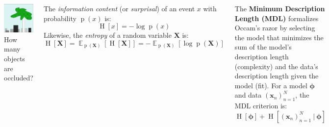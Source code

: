\documentclass[25pt,a0paper,landscape]{tikzposter}
\DeclareMathOperator{\opExpectation}{\mathbb{E}}
\newcommand{\E}[2]{\opExpectation_{#1} \left [ #2 \right ]}
\newcommand{\MidSymbol}[1][]{\:#1\:}
\newcommand{\given}{\MidSymbol[\vert]}
\DeclareMathOperator{\opInformationContent}{H}
\newcommand{\ICof}[1]{\opInformationContent[#1]}
\DeclareMathOperator{\opEntropy}{H}
\newcommand{\Hof}[1]{\opEntropy[#1]}
\DeclareMathOperator{\opp}{p}
\newcommand{\pof}[1]{\opp(#1)}
\newcommand{\h}{\boldsymbol{\phi}}
\newcommand{\xNset}{(\x_n)_{n=1}^N}
\newcommand{\x}{\boldsymbol{x}}
\newcommand{\X}{\boldsymbol{X}}
\begin{document}
\begin{columns}
{{\begin{backgroundbox}[title={Examples {\small (left: Reddit, right: \citet{mackay2003information})}}]
\begin{multicols}{2}
        \includegraphics[width=\linewidth]{mackay_343_example.png}
        {\small How many objects are occluded?}
      \end{multicols}
    \end{backgroundbox}
    \begin{backgroundbox}[title=Shannon's Information Content]
      The \emph{information content} (or \emph{surprisal}) of an event $x$ with probability $\pof{x}$ is:
      \begin{equation}
        \ICof{x} = -\log \pof{x}
      \end{equation}
      Likewise, the \emph{entropy} of a random variable $\X$ is:
      \begin{equation}
        \Hof{\X} = \E{\pof{\X}}{\ICof{\X}} = -\E{\pof{\X}}{\log \pof{\X}}
      \end{equation}
    \end{backgroundbox}
    \begin{backgroundbox}[title=Minimum Description Length (MDL)/MLE/MAP]
      The \textbf{Minimum Description Length (MDL)} formalizes Occam's razor by selecting the model that minimizes the sum of the model's description length (complexity) and the data's description length given the model (fit). For a model $\h$ and data $\xNset$, the MDL criterion is:
      \begin{equation}
        \ICof{\h} + \ICof{\xNset \given \h}

\end{equation}
\end{backgroundbox}}}
\end{columns}
\end{document}
